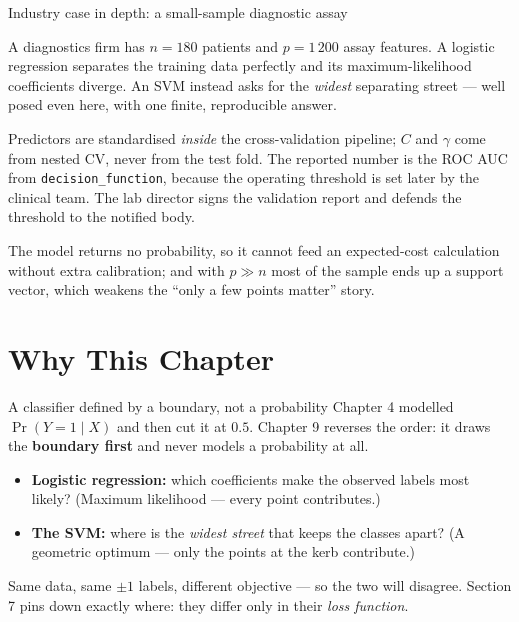 \documentclass[aspectratio=169,11pt]{beamer}
\begin{document}
\begin{frame}{Industry case in depth: a small-sample diagnostic assay}
  \scriptsize
  \begin{industry}
    A diagnostics firm has $n=180$ patients and $p=1\,200$ assay features. A
    logistic regression separates the training data perfectly and its
    maximum-likelihood coefficients diverge. An SVM instead asks for the
    \emph{widest} separating street --- well posed even here, with one finite,
    reproducible answer.
  \end{industry}
  \begin{readme}
    Predictors are standardised \emph{inside} the cross-validation pipeline;
    $C$ and $\gamma$ come from nested CV, never from the test fold. The
    reported number is the ROC AUC from \texttt{decision\_function}, because
    the operating threshold is set later by the clinical team. The lab director
    signs the validation report and defends the threshold to the notified body.
  \end{readme}
  \begin{takeaway}
    The model returns no probability, so it cannot feed an expected-cost
    calculation without extra calibration; and with $p \gg n$ most of the
    sample ends up a support vector, which weakens the ``only a few points
    matter'' story.
  \end{takeaway}
\end{frame}

\section{Why This Chapter}

\begin{frame}{A classifier defined by a boundary, not a probability}
  Chapter 4 modelled $\Pr(Y=1\mid X)$ and then cut it at $0.5$. Chapter 9
  reverses the order: it draws the \textbf{boundary first} and never models a
  probability at all.
  \begin{readme}
    \begin{itemize}
      \item \textbf{Logistic regression:} which coefficients make the observed
            labels most likely? (Maximum likelihood --- every point
            contributes.)
      \item \textbf{The SVM:} where is the \emph{widest street} that keeps the
            classes apart? (A geometric optimum --- only the points at the kerb
            contribute.)
    \end{itemize}
  \end{readme}
  \begin{takeaway}
    Same data, same $\pm1$ labels, different objective --- so the two will
    disagree. Section 7 pins down exactly where: they differ only in their
    \emph{loss function}.
  \end{takeaway}
\end{frame}
\end{document}
